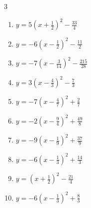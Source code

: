 \begin{multicols}{3}
\begin{enumerate}
  \item $\displaystyle y=5\left( x+\frac{1}{2}\right)^{2}-\frac{33}{4}$


  \item $\displaystyle y=-6\left( x-\frac{1}{2}\right)^{2}-\frac{11}{2}$


  \item $\displaystyle y=-7\left( x-\frac{3}{14}\right)^{2}-\frac{215}{28}$


  \item $\displaystyle y=3\left( x-\frac{4}{3}\right)^{2}-\frac{7}{3}$


  \item $\displaystyle y=-7\left( x-\frac{4}{7}\right)^{2}+\frac{2}{7}$


  \item $\displaystyle y=-2\left( x-\frac{9}{4}\right)^{2}+\frac{49}{8}$


  \item $\displaystyle y=-9\left( x-\frac{1}{9}\right)^{2}+\frac{37}{9}$


  \item $\displaystyle y=-6\left( x-\frac{1}{3}\right)^{2}+\frac{14}{3}$


  \item $\displaystyle y=\left( x+\frac{1}{2}\right)^{2}-\frac{21}{4}$


  \item $\displaystyle y=-6\left( x-\frac{1}{3}\right)^{2}+\frac{8}{3}$


\end{enumerate}
\end{multicols}
